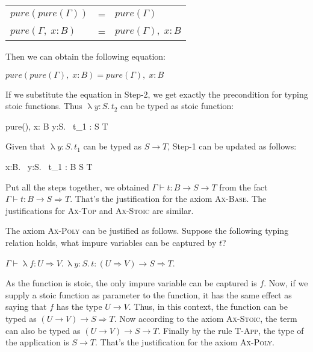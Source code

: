 \begin{center}
\begin{tabular}{l c l}
$pure(pure(\Gamma))$ & = & $pure(\Gamma)$ \\
$pure(\Gamma, \; x:B)$ & = & $pure(\Gamma), \; x:B$
\end{tabular}
\end{center}

Then we can obtain the following equation:

\begin{center}
  $pure(pure(\Gamma),\; x: B) = pure(\Gamma),\; x: B$
\end{center}

If we substitute the equation in Step-2, we get exactly the
precondition for typing stoic functions. Thus
$\uplambda y{:}S. \, t_2$ can be typed as stoic function:

{ pure(\Gamma),\; x: B \vdash \uplambda y{:}S. \, t_1 : S \to T }

Given that $\uplambda y{:}S. \, t_1$ can be typed as $S \to T$, Step-1 can
be updated as follows:

{ \Gamma \vdash \uplambda x{:}B. \, \uplambda y{:}S. \, t_1 : B \to S \to T }

Put all the steps together, we obtained
$\Gamma \vdash t : B \to S \to T$ from the fact
$\Gamma \vdash t : B \to S \Rightarrow T$. That's the justification
for the axiom \textsc{Ax-Base}. The justifications for \textsc{Ax-Top}
and \textsc{Ax-Stoic} are similar.

The axiom \textsc{Ax-Poly} can be justified as follows. Suppose the
following typing relation holds, what impure variables can be captured
by $t$?

\begin{center}
  $\Gamma \vdash \uplambda f{:}U \Rightarrow V. \, \uplambda y{:}S. \,
  t : (U \Rightarrow V) \to S \Rightarrow T$.
\end{center}

As the function is stoic, the only impure variable can be captured is
$f$. Now, if we supply a stoic function as parameter to the function,
it has the same effect as saying that $f$ has the type $U \to V$.
Thus, in this context, the function can be typed as
$(U \to V) \to S \Rightarrow T$.  Now according to the axiom
\textsc{Ax-Stoic}, the term can also be typed as
$(U \to V) \to S \to T$. Finally by the rule \textsc{T-App}, the type
of the application is $S \to T$. That's the justification for the
axiom \textsc{Ax-Poly}.

